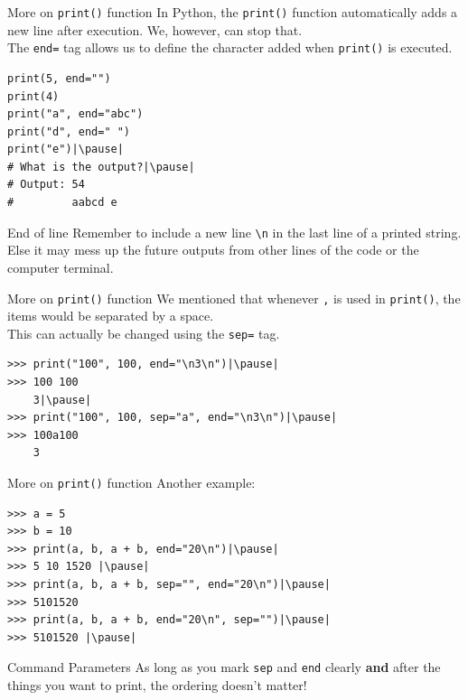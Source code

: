 \documentclass[dvipsnames, svgnames, x11names]{beamer}
\begin{document}
\begin{frame}[fragile]{More on \texttt{print()} function}
In Python, the \texttt{print()} function automatically adds a new line after execution. We, however, can stop that.\\
The \texttt{end=} tag allows us to define the character added when \texttt{print()} is executed.
\begin{verbatim}
print(5, end="")
print(4)
print("a", end="abc")
print("d", end=" ")
print("e")|\pause|
# What is the output?|\pause|
# Output: 54
#         aabcd e
\end{verbatim}
\begin{block}{End of line}
Remember to include a new line {\color{BrickRed}\texttt{\textbackslash n}} in the last line of a printed string.\\
Else it may mess up the future outputs from other lines of the code or the computer terminal.
\end{block}
\end{frame}

\begin{frame}[fragile]{More on \texttt{print()} function}
We mentioned that whenever \texttt{,} is used in \texttt{print()}, the items would be separated by a space.\\
This can actually be changed using the \texttt{sep=} tag.\pause
\begin{verbatim}
>>> print("100", 100, end="\n3\n")|\pause|
>>> 100 100
	3|\pause|
>>> print("100", 100, sep="a", end="\n3\n")|\pause|
>>> 100a100
	3
\end{verbatim}

\end{frame}

\begin{frame}[fragile]{More on \texttt{print()} function}
Another example:
\begin{verbatim}
>>> a = 5
>>> b = 10
>>> print(a, b, a + b, end="20\n")|\pause|
>>> 5 10 1520 |\pause|
>>> print(a, b, a + b, sep="", end="20\n")|\pause|
>>> 5101520	
>>> print(a, b, a + b, end="20\n", sep="")|\pause|
>>> 5101520	|\pause|
\end{verbatim}
\begin{block}{Command Parameters}
As long as you mark \texttt{sep} and \texttt{end} clearly \textbf{and} after the things you want to print, the ordering doesn't matter!
\end{block}
\end{frame}
\end{document}
